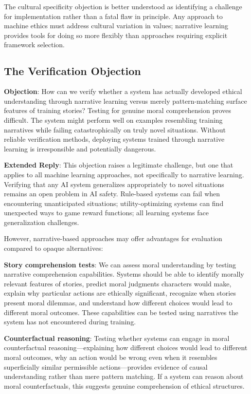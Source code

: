 \documentclass[12pt]{article}
\begin{document}
The cultural specificity objection is better understood as identifying a challenge for implementation rather than a fatal flaw in principle. Any approach to machine ethics must address cultural variation in values; narrative learning provides tools for doing so more flexibly than approaches requiring explicit framework selection.

\subsection{The Verification Objection}

\textbf{Objection}: How can we verify whether a system has actually developed ethical understanding through narrative learning versus merely pattern-matching surface features of training stories? Testing for genuine moral comprehension proves difficult. The system might perform well on examples resembling training narratives while failing catastrophically on truly novel situations. Without reliable verification methods, deploying systems trained through narrative learning is irresponsible and potentially dangerous.

\textbf{Extended Reply}: This objection raises a legitimate challenge, but one that applies to all machine learning approaches, not specifically to narrative learning. Verifying that any AI system generalizes appropriately to novel situations remains an open problem in AI safety. Rule-based systems can fail when encountering unanticipated situations; utility-optimizing systems can find unexpected ways to game reward functions; all learning systems face generalization challenges.

However, narrative-based approaches may offer advantages for evaluation compared to opaque alternatives:

\textbf{Story comprehension tests}: We can assess moral understanding by testing narrative comprehension capabilities. Systems should be able to identify morally relevant features of stories, predict moral judgments characters would make, explain why particular actions are ethically significant, recognize when stories present moral dilemmas, and understand how different choices would lead to different moral outcomes. These capabilities can be tested using narratives the system has not encountered during training.

\textbf{Counterfactual reasoning}: Testing whether systems can engage in moral counterfactual reasoning---explaining how different choices would lead to different moral outcomes, why an action would be wrong even when it resembles superficially similar permissible actions---provides evidence of causal understanding rather than mere pattern matching. If a system can reason about moral counterfactuals, this suggests genuine comprehension of ethical structures.
\end{document}
